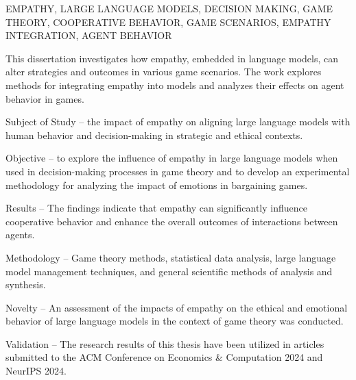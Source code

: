 \noindent EMPATHY, LARGE LANGUAGE MODELS, DECISION MAKING, GAME THEORY, COOPERATIVE BEHAVIOR, GAME SCENARIOS, EMPATHY INTEGRATION, AGENT BEHAVIOR

This dissertation investigates how empathy, embedded in language models, can alter strategies and outcomes in various game scenarios. The work explores methods for integrating empathy into models and analyzes their effects on agent behavior in games.

Subject of Study -- the impact of empathy on aligning large language models with human behavior and decision-making in strategic and ethical contexts.

Objective -- to explore the influence of empathy in large language models when used in decision-making processes in game theory and to develop an experimental methodology for analyzing the impact of emotions in bargaining games.

Results -- The findings indicate that empathy can significantly influence cooperative behavior and enhance the overall outcomes of interactions between agents.

Methodology -- Game theory methods, statistical data analysis, large language model management techniques, and general scientific methods of analysis and synthesis.

Novelty -- An assessment of the impacts of empathy on the ethical and emotional behavior of large language models in the context of game theory was conducted.

Validation -- The research results of this thesis have been utilized in articles submitted to the ACM Conference on Economics \& Computation 2024 and NeurIPS 2024.
